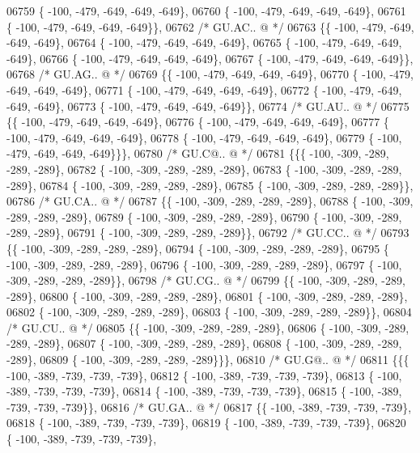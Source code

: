 \begin{DoxyCode}
06759 \{ -100, -479, -649, -649, -649\},
06760 \{ -100, -479, -649, -649, -649\},
06761 \{ -100, -479, -649, -649, -649\}\},
06762 \textcolor{comment}{/* GU.AC.. @ */}
06763 \{\{ -100, -479, -649, -649, -649\},
06764 \{ -100, -479, -649, -649, -649\},
06765 \{ -100, -479, -649, -649, -649\},
06766 \{ -100, -479, -649, -649, -649\},
06767 \{ -100, -479, -649, -649, -649\}\},
06768 \textcolor{comment}{/* GU.AG.. @ */}
06769 \{\{ -100, -479, -649, -649, -649\},
06770 \{ -100, -479, -649, -649, -649\},
06771 \{ -100, -479, -649, -649, -649\},
06772 \{ -100, -479, -649, -649, -649\},
06773 \{ -100, -479, -649, -649, -649\}\},
06774 \textcolor{comment}{/* GU.AU.. @ */}
06775 \{\{ -100, -479, -649, -649, -649\},
06776 \{ -100, -479, -649, -649, -649\},
06777 \{ -100, -479, -649, -649, -649\},
06778 \{ -100, -479, -649, -649, -649\},
06779 \{ -100, -479, -649, -649, -649\}\}\},
06780 \textcolor{comment}{/* GU.C@.. @ */}
06781 \{\{\{ -100, -309, -289, -289, -289\},
06782 \{ -100, -309, -289, -289, -289\},
06783 \{ -100, -309, -289, -289, -289\},
06784 \{ -100, -309, -289, -289, -289\},
06785 \{ -100, -309, -289, -289, -289\}\},
06786 \textcolor{comment}{/* GU.CA.. @ */}
06787 \{\{ -100, -309, -289, -289, -289\},
06788 \{ -100, -309, -289, -289, -289\},
06789 \{ -100, -309, -289, -289, -289\},
06790 \{ -100, -309, -289, -289, -289\},
06791 \{ -100, -309, -289, -289, -289\}\},
06792 \textcolor{comment}{/* GU.CC.. @ */}
06793 \{\{ -100, -309, -289, -289, -289\},
06794 \{ -100, -309, -289, -289, -289\},
06795 \{ -100, -309, -289, -289, -289\},
06796 \{ -100, -309, -289, -289, -289\},
06797 \{ -100, -309, -289, -289, -289\}\},
06798 \textcolor{comment}{/* GU.CG.. @ */}
06799 \{\{ -100, -309, -289, -289, -289\},
06800 \{ -100, -309, -289, -289, -289\},
06801 \{ -100, -309, -289, -289, -289\},
06802 \{ -100, -309, -289, -289, -289\},
06803 \{ -100, -309, -289, -289, -289\}\},
06804 \textcolor{comment}{/* GU.CU.. @ */}
06805 \{\{ -100, -309, -289, -289, -289\},
06806 \{ -100, -309, -289, -289, -289\},
06807 \{ -100, -309, -289, -289, -289\},
06808 \{ -100, -309, -289, -289, -289\},
06809 \{ -100, -309, -289, -289, -289\}\}\},
06810 \textcolor{comment}{/* GU.G@.. @ */}
06811 \{\{\{ -100, -389, -739, -739, -739\},
06812 \{ -100, -389, -739, -739, -739\},
06813 \{ -100, -389, -739, -739, -739\},
06814 \{ -100, -389, -739, -739, -739\},
06815 \{ -100, -389, -739, -739, -739\}\},
06816 \textcolor{comment}{/* GU.GA.. @ */}
06817 \{\{ -100, -389, -739, -739, -739\},
06818 \{ -100, -389, -739, -739, -739\},
06819 \{ -100, -389, -739, -739, -739\},
06820 \{ -100, -389, -739, -739, -739\},

\end{DoxyCode}
